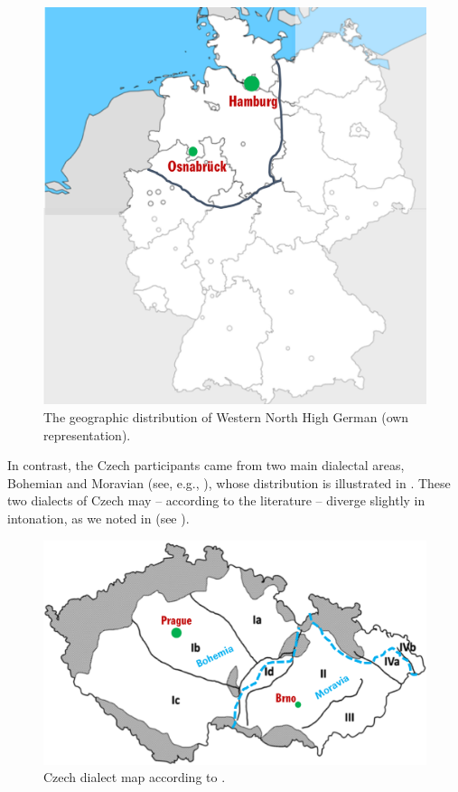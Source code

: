 \begin{figure}[p]
\includegraphics[width=.7\textwidth]{figures/a03HabilMethodology-img002-new.png}
\caption{The geographic distribution of Western North High German (own representation).}
\label{fig:3.2}
\end{figure}



In contrast, the Czech participants came from two main dialectal areas, Bohemian and Moravian (see, e.g., \citealt{Cvrček2010, ŠimáckováEtAl2012}), whose distribution is illustrated in . These two dialects of Czech may -- according to the literature -- diverge slightly in intonation, as we noted in  (see ).




\begin{figure}[p]
\includegraphics[width=.7\textwidth]{figures/a03HabilMethodology-img003-new.png}
\caption{Czech dialect map according to \citet{Kloferová2017}.\label{fig:3.3}}
\end{figure}



